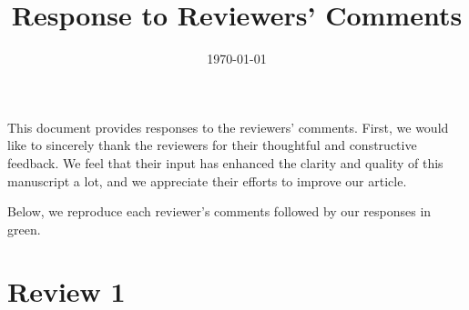 \documentclass{article}
\title{Response to Reviewers' Comments}
\date{\today}
\begin{document}
\maketitle

This document provides responses to the reviewers' comments. First, we would like to sincerely thank the reviewers for their thoughtful and constructive feedback. We feel that their input has enhanced the clarity and quality of this manuscript a lot, and we appreciate their efforts to improve our article.

Below, we reproduce each reviewer's comments followed by our responses in green.

\section*{Review 1}
\end{document}
